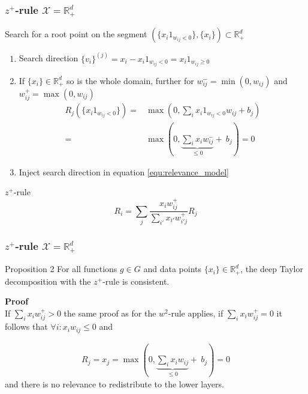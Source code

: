\documentclass{beamer}
\begin{document}
\begin{frame}
\frametitle{$z^+$-rule $\mathcal{X}=\mathbb{R}_+^d$}
\vspace{0.35cm}
Search for a root point on the segment $(\{x_i 1_{w_{ij}<0}\},\{x_i\})\subset \mathbb{R}_+^d$\\
\begin{enumerate}
	\item Search direction $\{v_i\}^{(j)} = x_i - x_i 1_{w_{ij}<0} = x_i 1_{w_{ij}\geq0}$
	\item If $\{x_i\} \in \mathbb{R}_+^d$ so is the whole domain, further for $w_{ij}^-=\min(0,w_{ij})$ and $w_{ij}^+ = \max(0, w_{ij})$
	\vspace{-0.25cm}
	\begin{align*}
		R_j(\{x_i1_{w_{ij}<0}\}) =& \max(0, \sum_i x_i 1_{w_{ij}<0} w_{ij} + b_j)\\
		=& \max(0, \underbrace{\sum_i x_i  w_{ij}^-}_{\leq 0} +\ b_j) = 0
	\end{align*}
	\vspace{-0.25cm}
	\item Inject search direction in equation \eqref{equ:relevance_model}
\end{enumerate}
\vspace{-0.2cm}
\pause
\begin{block}{$z^+$-rule}
\begin{equation*}
R_i =  \sum_j \frac{x_i w_{ij}^+}{\sum_{i'} x_{i'} w_{i'j}^+} R_j
\end{equation*}
\end{block}

\end{frame}



\begin{frame}
\frametitle{$z^+$-rule $\mathcal{X}=\mathbb{R}^d_+$}

\begin{block}{Proposition 2}
For all functions $g \in G$ and data points $\{x_i\} \in \mathbb{R}_+^d$, the deep Taylor decomposition with the $z^+$-rule is consistent.
\end{block}
\vspace{0.5cm}

\pause
\textbf{Proof}\\
If $\sum_i x_i w_{ij}^+ >0$ the same proof as for the $w^2$-rule applies, if $\sum_i x_i w_{ij}^+ =0$ it follows that $\forall i: x_i w_{ij} \leq0$ and 

\begin{align*}
 R_j = x_j = \max(0,\underbrace{\sum_i x_i w_{ij}}_{\leq 0} +\ b_j) = 0
\end{align*}
and there is no relevance to redistribute to the lower layers.


\end{frame}
\end{document}
